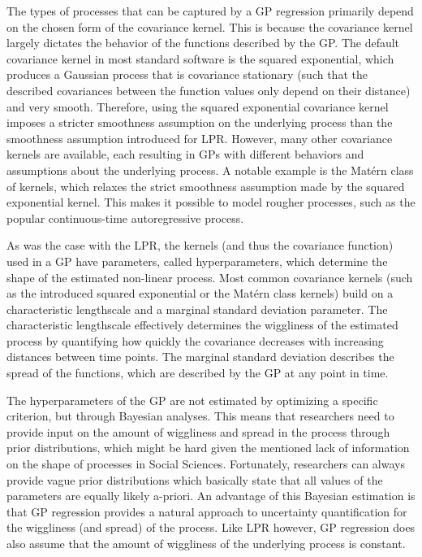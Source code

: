 \documentclass[man, floatsintext]{apa7}
\begin{document}
\noindent The types of processes that can be captured by a GP regression
primarily depend on the chosen form of the covariance kernel. This is because
the covariance kernel largely dictates the behavior of the functions described
by the GP\@. The default covariance kernel in most standard software is the
squared exponential, which produces a Gaussian process that is covariance
stationary (such that the described covariances between the function values
only depend on their distance) and very smooth. Therefore, using the squared
exponential covariance kernel imposes a stricter smoothness assumption on the
underlying process than the smoothness assumption introduced for LPR\@.
However, many other covariance kernels are available, each resulting in GPs
with different behaviors and assumptions about the underlying process. A
notable example is the Matérn class of kernels, which relaxes the strict
smoothness assumption made by the squared exponential kernel. This makes it
possible to model rougher processes, such as the popular continuous-time
autoregressive process.

As was the case with the LPR, the kernels (and thus the covariance function)
used in a GP have parameters, called hyperparameters, which determine the shape
of the estimated non-linear process. Most common covariance kernels (such as
the introduced squared exponential or the Matérn class kernels) build on a
characteristic lengthscale and a marginal standard deviation parameter. The
characteristic lengthscale effectively determines the wiggliness of the
estimated process by quantifying how quickly the covariance decreases with
increasing distances between time points. The marginal standard deviation
describes the spread of the functions, which are described by the GP at any
point in time.

The hyperparameters of the GP are not estimated by optimizing a
specific criterion, but through Bayesian analyses. This means that researchers
need to provide input on the amount of wiggliness and spread in the process
through prior distributions, which might be hard given the mentioned lack of
information on the shape of processes in Social Sciences. Fortunately,
researchers can always provide vague prior distributions which basically state
that all values of the parameters are equally likely a-priori. An advantage of
this Bayesian estimation is that GP regression provides a natural approach to
uncertainty quantification for the wiggliness (and spread) of the process. Like
LPR however, GP regression does also assume that the amount of wiggliness of
the
underlying process is constant.
\end{document}
